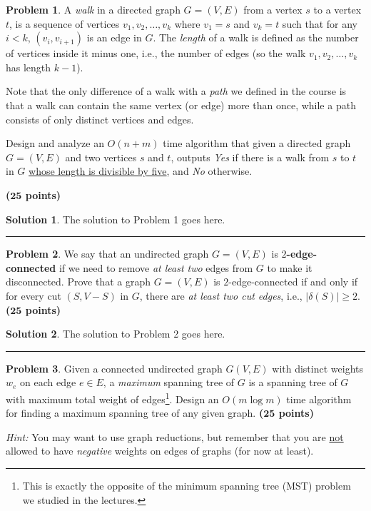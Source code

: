 \documentclass{article}
\theoremstyle{definition}
\newtheorem{problem}{Problem}
\def\fline{\rule{0.75\linewidth}{0.5pt}}
\newcommand{\finishline}{\begin{center}\fline\end{center}}
\newtheorem*{solution*}{Solution}
\newenvironment{solution}{\begin{solution*}}{{\finishline} \end{solution*}}
\newcommand{\grade}[1]{\hfill{\textbf{($\mathbf{#1}$ points)}}}
\begin{document}
\begin{problem}
A \emph{walk} in a directed graph $G=(V,E)$ from a vertex $s$ to a vertex $t$, is a sequence of vertices $v_1,v_2,\ldots,v_k$ where $v_1 = s$ and $v_k=t$ such that for any $i < k$,  $(v_i,v_{i+1})$ is an edge in $G$. The \emph{length} of a walk
is defined as the number of vertices inside it minus one, i.e., the number of edges (so the walk $v_1,v_2,\ldots,v_k$ has length $k-1$). 

Note that the only difference 
of a walk with a \emph{path} we defined in the course is that a walk can contain the same vertex (or edge) more than once, while a path consists of only distinct vertices and edges. 

Design and analyze an $O(n+m)$ time algorithm that given a directed graph $G=(V,E)$ and two vertices $s$ and $t$, outputs \emph{Yes} if there is a walk from $s$ to $t$ in $G$ \underline{whose length is divisible by five}, and \emph{No} otherwise. 

\grade{25}

\end{problem}

\begin{solution}
The solution to Problem 1 goes here.
\end{solution}


\medskip

\begin{problem}
	We say that an undirected graph $G=(V,E)$ is \textbf{$2$-edge-connected} if we need to remove \emph{at least two} edges from $G$ to make it disconnected. Prove that a 
	graph $G=(V,E)$ is $2$-edge-connected if and only if for every cut $(S,V-S)$ in $G$, there are \emph{at least two cut edges}, i.e., $|{\delta(S)}| \geq 2$. \grade{25}
\end{problem}

\begin{solution}
The solution to Problem 2 goes here.
\end{solution}


\medskip

\begin{problem}
	Given a connected undirected graph $G(V,E)$ with distinct weights $w_e$ on each edge $e \in E$, a \emph{maximum} spanning tree of $G$ is a spanning tree of $G$ with maximum total weight of edges\footnote{This is exactly the opposite 
	of the minimum spanning tree (MST) problem we studied in the lectures.}. Design an $O(m\log{m})$ time algorithm for finding a maximum spanning tree of any given graph. 
	\grade{25}
	
	\emph{Hint:} You may want to use graph reductions, but remember that you are \underline{not} allowed to have \emph{negative} weights on edges of graphs (for now at least). 
\end{problem}
\end{document}
